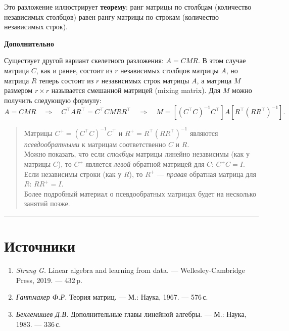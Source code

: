\documentclass[11pt,a4paper]{article}
\renewcommand{\linethickness}{0.1ex}
\providecommand{\tightlist}{%
      \setlength{\itemsep}{0pt}\setlength{\parskip}{0pt}}
\begin{document}
Это разложение иллюстрирует \textbf{теорему}: ранг матрицы по столбцам
(количество независимых столбцов) равен рангу матрицы по строкам
(количество независимых строк).

    \textbf{Дополнительно}

Существует другой вариант скелетного разложения: \(A = CMR\).
В этом случае матрица \(C\), как и ранее, состоит из \(r\) независимых столбцов матрицы \(A\), но матрица \(R\) теперь состоит из \(r\) независимых строк матрицы \(A\), а матрица \(M\) размером \(r \times r\) называется смешанной матрицей (mixing matrix). Для \(M\) можно получить следующую формулу: \[
  A = CMR \quad \Rightarrow \quad
  C^\top A R^\top = C^\top C M R R^\top \quad \Rightarrow \quad
  M = \left[ (C^\top C)^{-1}C^\top \right] A \left[ R^\top (R R^\top)^{-1} \right].
\]

    \begin{quote}
Матрицы \(C^+ = (C^\top C)^{-1}C^\top\) и
\(R^+ = R^\top (R R^\top)^{-1}\) являются \emph{псевдообратными} к
матрицам соответственно \(C\) и \(R\).\\
Можно показать, что если \emph{столбцы} матрицы линейно независимы (как
у матрицы \(C\)), то \(C^+\) является \emph{левой} обратной матрицей для
\(C\): \(C^+ C = I\). Если независимы строки (как у \(R\)), то \(R^+\)
--- \emph{правая} обратная матрица для \(R\): \(R R^+ = I\).\\
Более подробный материал о псевдообратных матрицах будет на несколько
занятий позже.
\end{quote}

    \begin{center}\rule{0.5\linewidth}{\linethickness}\end{center}

    \hypertarget{ux438ux441ux442ux43eux447ux43dux438ux43aux438}{%
\section{Источники}\label{ux438ux441ux442ux43eux447ux43dux438ux43aux438}}

\begin{enumerate}
\def\labelenumi{\arabic{enumi}.}
\tightlist
\item
  \emph{Strang G.} Linear algebra and learning from data. ---
  Wellesley-Cambridge Press, 2019. --- 432\,p.
\item
  \emph{Гантмахер Ф.Р.} Теория матриц. --- М.: Наука, 1967. --- 576\,с.
\item
  \emph{Беклемишев Д.В.} Дополнительные главы линейной алгебры. --- М.:
  Наука, 1983. --- 336\,с.
\end{enumerate}


\end{document}

